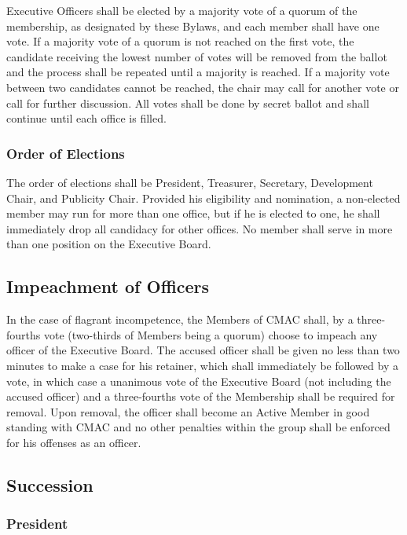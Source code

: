\documentclass{article}
\begin{document}
Executive Officers shall be elected by a majority vote of a quorum
of the membership, as designated by these Bylaws, and each member
shall have one vote. If a majority vote of a quorum is not reached
on the first vote, the candidate receiving the lowest number of votes
will be removed from the ballot and the process shall be repeated
until a majority is reached. If a majority vote between two candidates
cannot be reached, the chair may call for another vote or call for
further discussion. All votes shall be done by secret ballot and shall
continue until each office is filled.

\subsubsection{Order of Elections}

The order of elections shall be President, Treasurer, Secretary, Development
Chair, and Publicity Chair. Provided his eligibility and nomination,
a non-elected member may run for more than one office, but if he is
elected to one, he shall immediately drop all candidacy for other
offices. No member shall serve in more than one position on the Executive
Board.

\subsection{Impeachment of Officers}

In the case of flagrant incompetence, the Members of CMAC shall, by
a three-fourths vote (two-thirds of Members being a quorum) choose
to impeach any officer of the Executive Board. The accused officer
shall be given no less than two minutes to make a case for his retainer,
which shall immediately be followed by a vote, in which case a unanimous
vote of the Executive Board (not including the accused officer) and
a three-fourths vote of the Membership shall be required for removal.
Upon removal, the officer shall become an Active Member in good standing
with CMAC and no other penalties within the group shall be enforced
for his offenses as an officer.

\subsection{Succession}

\subsubsection{President}
\end{document}
